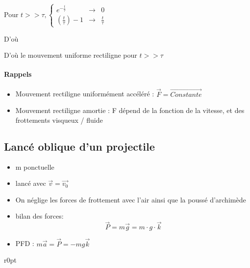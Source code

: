 Pour $t >> \tau, \left\{\begin{array}{rcl}
e^{-\frac{t}{\tau}} &\rightarrow& 0 \\
(\frac{t}{\tau})-1 &\rightarrow& \frac{t}{\tau}
\end{array}\right.$~\\
\begin{center}D'où \end{center}
D'où le mouvement uniforme rectiligne pour $t >> \tau$

\paragraph{Rappels}
\begin{itemize}
\item Mouvement rectiligne uniformément accéléré : $\vec{F} = \overrightarrow{Constante}$
\item Mouvement rectiligne amortie : F dépend de la fonction de la vitesse, et des frottements visqueux / fluide
\end{itemize}

\subsection{Lancé oblique d'un projectile}

\begin{itemize}
	\item m ponctuelle
	\item lancé avec $\vec{v} = \vec{v_0}$
	\item On néglige les forces de frottement avec l'air ainsi que la poussé d'archimède
	\item bilan des forces: \[\vec{P} = m \vec{g} = m \cdot g \cdot \vec{k}\]
	\item PFD : $m\vec{a} = \vec{P} = -mg\vec{k}$
\end{itemize}

\begin{wrapfigure}[10]{r}{0pt}
\end{wrapfigure}

